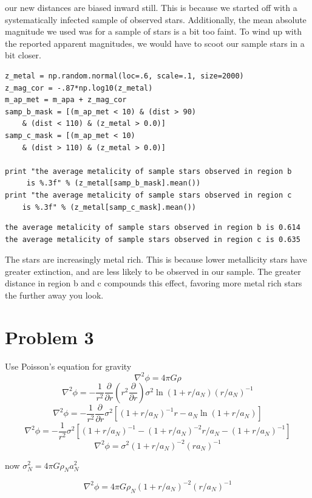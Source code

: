\documentclass[12pt]{article}
\begin{document}
our new distances are biased inward still. This is because we started off with a systematically infected sample of observed stars. Additionally, the mean absolute magnitude we used was for a sample of stars is a bit too faint. To wind up with the reported apparent magnitudes, we would have to scoot our sample stars in a bit closer.

\begin{lstlisting}
z_metal = np.random.normal(loc=.6, scale=.1, size=2000)
z_mag_cor = -.87*np.log10(z_metal)
m_ap_met = m_apa + z_mag_cor
samp_b_mask = [(m_ap_met < 10) & (dist > 90) 
	& (dist < 110) & (z_metal > 0.0)]
samp_c_mask = [(m_ap_met < 10) 
	& (dist > 110) & (z_metal > 0.0)]

print "the average metalicity of sample stars observed in region b
	 is %.3f" % (z_metal[samp_b_mask].mean())
print "the average metalicity of sample stars observed in region c 
	is %.3f" % (z_metal[samp_c_mask].mean())
\end{lstlisting}

\begin{lstlisting}[frame=none]
the average metalicity of sample stars observed in region b is 0.614
the average metalicity of sample stars observed in region c is 0.635
\end{lstlisting}
The stars are increasingly metal rich. This is because lower metallicity stars have greater extinction, and are less likely to be observed in our sample. The greater distance in region b and c compounds this effect, favoring more metal rich stars the further away you look.
\section{Problem 3}

Use Poisson's equation for gravity
$$\nabla^{2} \phi = 4\pi G \rho $$
$$\nabla^{2} \phi = -\frac{1}{r^{2}} \frac{\partial}{\partial r} (r^2 \frac{\partial }{\partial r} ) \sigma^{2} \ln (1 + r/a_{N} ) (r/a_{N})^{-1}$$
$$\nabla^{2} \phi = -\frac{1}{r^{2}} \frac{\partial}{\partial r} \sigma^{2}[ (1 + r/a_{N})^{-1}r-a_{N} \ln (1 + r/a_{N})]$$
$$\nabla^{2} \phi = -\frac{1}{r^{2}}  \sigma^{2}[ (1 + r/a_{N})^{-1} -  (1 + r/a_{N})^{-2} r/a_{N} -  (1 + r/a_{N})^{-1}]$$
$$\nabla^{2} \phi =  \sigma^{2}  (1 + r/a_{N})^{-2} (ra_{N})^{-1} $$

now $\sigma^{2}_{N} = 4\pi G \rho_{N} a_{N}^2$

$$\nabla^{2} \phi =   4\pi G \rho_{N} (1 + r/a_{N})^{-2} (r/a_{N})^{-1} $$
\end{document}
